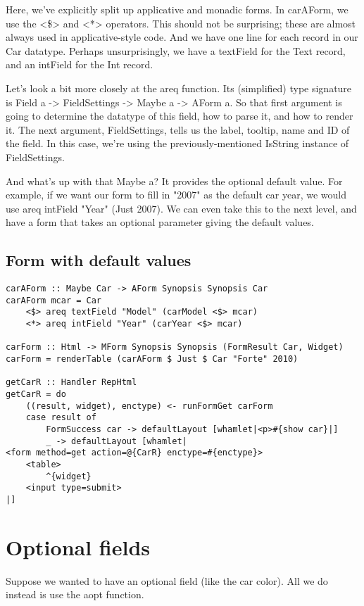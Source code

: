 Here, we've explicitly split up applicative and monadic forms. In carAForm, we use the <\$> and <*> operators. This should not be surprising; these are almost always used in applicative-style code. And we have one line for each record in our Car datatype. Perhaps unsurprisingly, we have a textField for the Text record, and an intField for the Int record.

Let's look a bit more closely at the areq function. Its (simplified) type signature is Field a -> FieldSettings -> Maybe a -> AForm a. So that first argument is going to determine the datatype of this field, how to parse it, and how to render it. The next argument, FieldSettings, tells us the label, tooltip, name and ID of the field. In this case, we're using the previously-mentioned IsString instance of FieldSettings.

And what's up with that Maybe a? It provides the optional default value. For example, if we want our form to fill in "2007" as the default car year, we would use areq intField "Year" (Just 2007). We can even take this to the next level, and have a form that takes an optional parameter giving the default values.

\subsection{Form with default values}

\begin{lstlisting}
carAForm :: Maybe Car -> AForm Synopsis Synopsis Car
carAForm mcar = Car
    <$> areq textField "Model" (carModel <$> mcar)
    <*> areq intField "Year" (carYear <$> mcar)

carForm :: Html -> MForm Synopsis Synopsis (FormResult Car, Widget)
carForm = renderTable (carAForm $ Just $ Car "Forte" 2010)

getCarR :: Handler RepHtml
getCarR = do
    ((result, widget), enctype) <- runFormGet carForm
    case result of
        FormSuccess car -> defaultLayout [whamlet|<p>#{show car}|]
        _ -> defaultLayout [whamlet|
<form method=get action=@{CarR} enctype=#{enctype}>
    <table>
        ^{widget}
    <input type=submit>
|]
\end{lstlisting}

\section{Optional fields}

Suppose we wanted to have an optional field (like the car color). All we do instead is use the aopt function.


